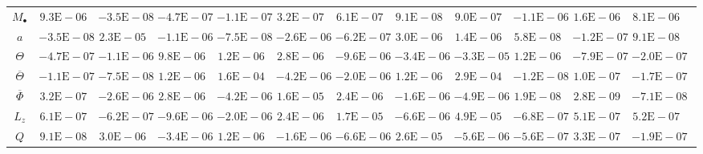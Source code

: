 \begin{sidewaystable}[htbp]\footnotesize
\centering
\begin{tabular}{cD{.}{.}{2.5}D{.}{.}{2.5}D{.}{.}{2.5}D{.}{.}{2.5}D{.}{.}{2.5}D{.}{.}{2.5}D{.}{.}{2.5}D{.}{.}{2.5}D{.}{.}{2.5}D{.}{.}{2.5}D{.}{.}{2.5}c}
\toprule
 &  &  &  &  &  &  &  &  &  &  &  \\ \midrule
$M_\bullet$ & $9.3\mathrm{E}-06$ & $-3.5\mathrm{E}-08$ & $-4.7\mathrm{E}-07$ & $-1.1\mathrm{E}-07$ & $3.2\mathrm{E}-07$ & $6.1\mathrm{E}-07$ & $9.1\mathrm{E}-08$ & $9.0\mathrm{E}-07$ & $-1.1\mathrm{E}-06$ & $1.6\mathrm{E}-06$ & $8.1\mathrm{E}-06$ \\
$a$ & $-3.5\mathrm{E}-08$ & $2.3\mathrm{E}-05$ & $-1.1\mathrm{E}-06$ & $-7.5\mathrm{E}-08$ & $-2.6\mathrm{E}-06$ & $-6.2\mathrm{E}-07$ & $3.0\mathrm{E}-06$ & $1.4\mathrm{E}-06$ & $5.8\mathrm{E}-08$ & $-1.2\mathrm{E}-07$ & $9.1\mathrm{E}-08$ \\
$\Theta$ & $-4.7\mathrm{E}-07$ & $-1.1\mathrm{E}-06$ & $9.8\mathrm{E}-06$ & $1.2\mathrm{E}-06$ & $2.8\mathrm{E}-06$ & $-9.6\mathrm{E}-06$ & $-3.4\mathrm{E}-06$ & $-3.3\mathrm{E}-05$ & $1.2\mathrm{E}-06$ & $-7.9\mathrm{E}-07$ & $-2.0\mathrm{E}-07$ \\
$\overline{\Theta}$ & $-1.1\mathrm{E}-07$ & $-7.5\mathrm{E}-08$ & $1.2\mathrm{E}-06$ & $1.6\mathrm{E}-04$ & $-4.2\mathrm{E}-06$ & $-2.0\mathrm{E}-06$ & $1.2\mathrm{E}-06$ & $2.9\mathrm{E}-04$ & $-1.2\mathrm{E}-08$ & $1.0\mathrm{E}-07$ & $-1.7\mathrm{E}-07$ \\
$\overline{\Phi}$ & $3.2\mathrm{E}-07$ & $-2.6\mathrm{E}-06$ & $2.8\mathrm{E}-06$ & $-4.2\mathrm{E}-06$ & $1.6\mathrm{E}-05$ & $2.4\mathrm{E}-06$ & $-1.6\mathrm{E}-06$ & $-4.9\mathrm{E}-06$ & $1.9\mathrm{E}-08$ & $2.8\mathrm{E}-09$ & $-7.1\mathrm{E}-08$ \\
$L_z$ & $6.1\mathrm{E}-07$ & $-6.2\mathrm{E}-07$ & $-9.6\mathrm{E}-06$ & $-2.0\mathrm{E}-06$ & $2.4\mathrm{E}-06$ & $1.7\mathrm{E}-05$ & $-6.6\mathrm{E}-06$ & $4.9\mathrm{E}-05$ & $-6.8\mathrm{E}-07$ & $5.1\mathrm{E}-07$ & $5.2\mathrm{E}-07$ \\
$Q$ & $9.1\mathrm{E}-08$ & $3.0\mathrm{E}-06$ & $-3.4\mathrm{E}-06$ & $1.2\mathrm{E}-06$ & $-1.6\mathrm{E}-06$ & $-6.6\mathrm{E}-06$ & $2.6\mathrm{E}-05$ & $-5.6\mathrm{E}-06$ & $-5.6\mathrm{E}-07$ & $3.3\mathrm{E}-07$ & $-1.9\mathrm{E}-07$ \\

\end{tabular}
\end{sidewaystable}
